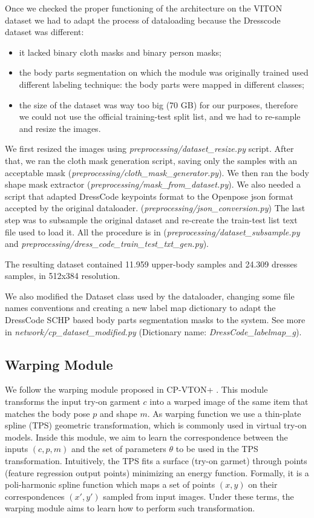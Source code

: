 Once we checked the proper functioning of the architecture on the VITON dataset we had to adapt the process of dataloading because the Dresscode dataset was different:
\begin{itemize}
\item it lacked binary cloth masks and binary person masks;
\item the body parts segmentation on which the module was originally trained used different labeling technique: the body parts were mapped in different classes;
\item the size of the dataset was way too big (70 GB) for our purposes, therefore we could not use the official training-test split list, and we had to re-sample and resize the images.
\end{itemize}

We first resized the images using \textit{preprocessing/dataset\_resize.py} script. 
After that, we ran the cloth mask generation script, saving only the samples with an acceptable mask (\textit{preprocessing/cloth\_mask\_generator.py}).
We then ran the body shape mask extractor (\textit{preprocessing/mask\_from\_dataset.py}).
We also needed a script that adapted DressCode keypoints format to the Openpose json format accepted by the original dataloader. (\textit{preprocessing/json\_conversion.py})
The last step was to subsample the original dataset and re-create the train-test list text file used to load it. All the procedure is in (\textit{preprocessing/dataset\_subsample.py} and \textit{preprocessing/dress\_code\_train\_test\_txt\_gen.py}).

The resulting dataset contained 11.959 upper-body samples and 24.309 dresses samples, in 512x384 resolution. 

We also modified the Dataset class used by the dataloader, changing some file names conventions and creating a new label map dictionary to adapt the DressCode SCHP based body parts segmentation masks to the system. See more in \textit{network/cp\_dataset\_modified.py} (Dictionary name: \textit{DressCode\_labelmap\_g}).

\subsection{Warping Module}
We follow the warping module proposed in CP-VTON+ \cite{CP-VTON+}.
This module transforms the input try-on garment $c$ into a warped image of the same item that matches the body pose $p$ and shape $m$. As warping function we use a thin-plate spline (TPS) geometric transformation, which is commonly used in virtual try-on models.  Inside this module, we aim to learn the correspondence between the inputs $(c, p, m)$ and the set of parameters $\theta$ to be used in the TPS transformation. Intuitively, the TPS fits a surface (try-on garmet) through points (feature regression output points) minimizing an energy function. Formally, it is a poli-harmonic spline function which maps a set of points $(x,y)$ on their correspondences $(x',y')$ sampled from input images. Under these terms, the warping module aims to learn how to perform such transformation.

